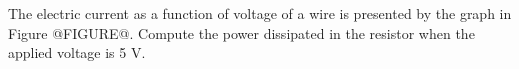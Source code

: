 The electric current as a function of voltage of a wire is presented 
by the graph in Figure @FIGURE@.
Compute the power dissipated in
the resistor when the applied voltage is 5 V.